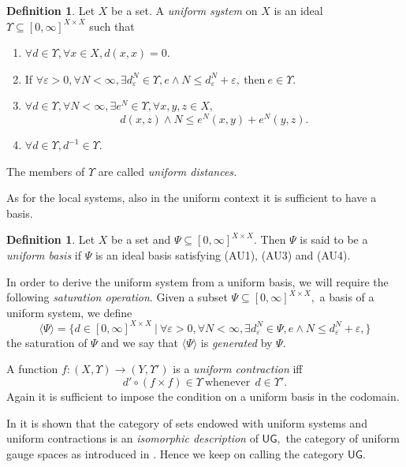 \documentclass[12pt,a4paper]{amsart}
\theoremstyle{theorem}
\theoremstyle{definition}
\newtheorem{definition}[theorem]{Definition}
\newcommand{\ug}{\ensuremath{\mathsf{UG}}}
\newcommand{\ve}{\ensuremath{\varepsilon}}
\def\rw{\rightarrow}
\begin{document}
{\begin{definition}\label{usystems}
Let $X$ be a set. A \emph{uniform system} on $X$ is an ideal $\Upsilon \subseteq [0,\infty] ^{X \times X}$ such that 
\begin{enumerate}
\item [(AU1)] $\forall d \in \Upsilon, \forall x \in X, d(x,x) = 0.$
\item [(AU2)] If $\forall \ve >0, \forall N < \infty, \exists d_\ve^N \in \Upsilon, e \wedge N \leq d_\ve^N + \ve, \ \text{then} \ e \in \Upsilon.$
\item [(AU3)] $ \forall d \in \Upsilon, \forall N < \infty, \exists e^N \in \Upsilon, \forall x,y,z \in X,$
$$
d(x,z) \wedge N \leq e ^N (x,y) + e^N (y,z).
$$
\item [(AU4)] $\forall d \in \Upsilon , d^{-1} \in \Upsilon.$
\end{enumerate}
\end{definition}


The members of $\Upsilon$ are called \emph{uniform distances.}

As for the local systems, also in the uniform context it is sufficient to have a basis.
\begin{definition}\label{ubsystem}
Let $X$ be a set and $\Psi \subseteq [0,\infty] ^{X \times X}$. Then $\Psi$ is said to be a \emph{uniform basis} if $\Psi$ is an ideal basis satisfying (AU1), (AU3) and (AU4).
\end{definition}

In order to derive the uniform system from a uniform basis, we will require the following \emph{saturation operation}.
Given a subset $\Psi \subseteq [0,\infty]^{X \times X},$ a basis of a uniform system, we define 
\begin{equation}
\langle \Psi \rangle = \{d \in [0,\infty] ^{X \times X} \ | \ \forall \ve >0, \forall N < \infty, \exists d_\ve^N \in \Psi, e \wedge N \leq d_\ve^N + \ve, \}
\end{equation}
the saturation of $\Psi$ and we say that $\langle \Psi \rangle$ is \emph{generated} by $\Psi$.


A function $f: (X, \Upsilon) \rw (Y, \Upsilon')$ is a \emph{uniform contraction} iff 
\begin{equation}\label{contractsystem}
 d' \circ (f \times f)\in \Upsilon  \ \text{whenever} \ \ d \in \Upsilon'.
\end{equation}
Again it is sufficient to impose the condition on a uniform basis in the codomain.


In \cite{LW} it is shown that the category of sets endowed with uniform systems and uniform contractions is an \emph{isomorphic description} of $\ug,$ the category of uniform gauge spaces as introduced in \cite{LOW}. Hence we keep on calling the category $\ug$. 
 
}
\end{document}
